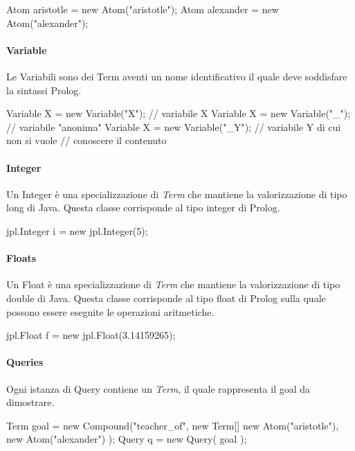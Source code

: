 \begin{javacode}
Atom aristotle = new Atom("aristotle");
Atom alexander = new Atom("alexander");
\end{javacode}

\paragraph{Variable}
Le Variabili sono dei Term aventi un nome identificativo il quale deve soddisfare la sintassi Prolog.

\begin{javacode}
Variable X = new Variable("X");  //  variabile X
Variable X = new Variable("_");  //  variabile "anonima"
Variable X = new Variable("_Y"); // variabile Y di cui non si vuole 
                 // conoscere il contenuto
\end{javacode}

\paragraph{Integer}
Un Integer è una specializzazione di \emph{Term} che mantiene la valorizzazione di tipo long di Java. Questa classe corrisponde al tipo integer di Prolog.

\begin{javacode}
jpl.Integer i = new jpl.Integer(5);
\end{javacode}

\paragraph{Floats}
Un Float è una specializzazione di \emph{Term} che mantiene la valorizzazione di tipo double di Java. Questa classe corrisponde al tipo float di Prolog sulla quale possono essere eseguite le operazioni aritmetiche.

\begin{javacode}
  jpl.Float f = new jpl.Float(3.14159265);
\end{javacode}

\paragraph{Queries}
Ogni istanza di Query contiene un \emph{Term}, il quale rappresenta il goal da dimostrare.

\begin{javacode}
  Term goal = new Compound("teacher_of",
    new Term[] {
        new Atom("aristotle"),
        new Atom("alexander")
        }
  );
  Query q = new Query( goal );
\end{javacode}

